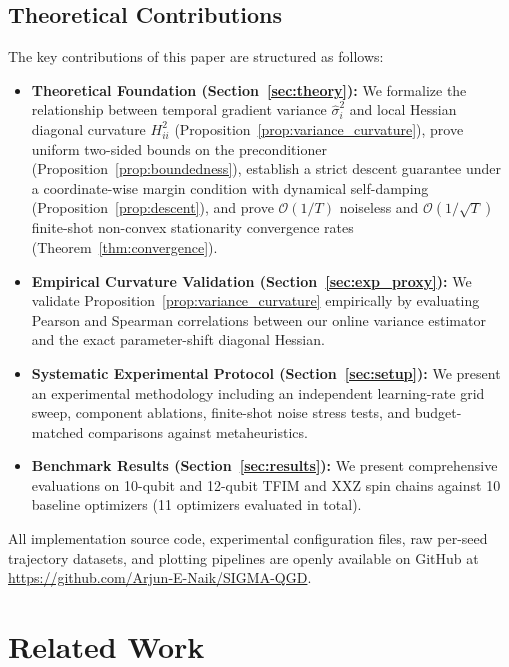\documentclass[11pt,a4paper]{article}
\begin{document}
\subsection{Theoretical Contributions}
The key contributions of this paper are structured as follows:
\begin{itemize}
    \item \textbf{Theoretical Foundation (Section~\ref{sec:theory}):} We formalize the relationship between temporal gradient variance $\hat{\sigma}_i^2$ and local Hessian diagonal curvature $H_{ii}^2$ (Proposition~\ref{prop:variance_curvature}), prove uniform two-sided bounds on the preconditioner (Proposition~\ref{prop:boundedness}), establish a strict descent guarantee under a coordinate-wise margin condition with dynamical self-damping (Proposition~\ref{prop:descent}), and prove $\mathcal{O}(1/T)$ noiseless and $\mathcal{O}(1/\sqrt{T})$ finite-shot non-convex stationarity convergence rates (Theorem~\ref{thm:convergence}).
    \item \textbf{Empirical Curvature Validation (Section~\ref{sec:exp_proxy}):} We validate Proposition~\ref{prop:variance_curvature} empirically by evaluating Pearson and Spearman correlations between our online variance estimator and the exact parameter-shift diagonal Hessian.
    \item \textbf{Systematic Experimental Protocol (Section~\ref{sec:setup}):} We present an experimental methodology including an independent learning-rate grid sweep, component ablations, finite-shot noise stress tests, and budget-matched comparisons against metaheuristics.
    \item \textbf{Benchmark Results (Section~\ref{sec:results}):} We present comprehensive evaluations on 10-qubit and 12-qubit TFIM and XXZ spin chains against 10 baseline optimizers (11 optimizers evaluated in total).
\end{itemize}
All implementation source code, experimental configuration files, raw per-seed trajectory datasets, and plotting pipelines are openly available on GitHub at \url{https://github.com/Arjun-E-Naik/SIGMA-QGD}.

\section{Related Work}
\label{sec:related}
\end{document}
